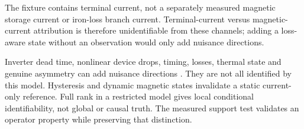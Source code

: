 The fixture contains terminal current, not a separately measured magnetic
storage current or iron-loss branch current. Terminal-current versus
magnetic-current attribution is therefore unidentifiable from these channels;
adding a loss-aware state without an observation would only add nuisance
directions.

Inverter dead time, nonlinear device drops, timing, losses, thermal state and
genuine asymmetry can add nuisance directions \cite{liu2018,richter2014}.
They are not all identified by this model. Hysteresis and dynamic magnetic
states invalidate a static current-only reference. Full rank in a restricted
model gives local conditional identifiability, not global or causal truth.
The measured support test validates an operator property while preserving
that distinction.
